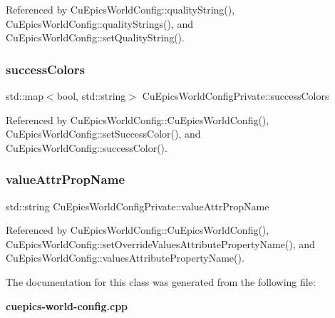 Referenced by Cu\+Epics\+World\+Config\+::quality\+String(), Cu\+Epics\+World\+Config\+::quality\+Strings(), and Cu\+Epics\+World\+Config\+::set\+Quality\+String().

\mbox{\label{classCuEpicsWorldConfigPrivate_a244f2beac45bda2ca2ff4de24f0e2943}} 
\subsubsection{success\+Colors}
{\footnotesize\ttfamily std\+::map$<$bool, std\+::string$>$ Cu\+Epics\+World\+Config\+Private\+::success\+Colors}



Referenced by Cu\+Epics\+World\+Config\+::\+Cu\+Epics\+World\+Config(), Cu\+Epics\+World\+Config\+::set\+Success\+Color(), and Cu\+Epics\+World\+Config\+::success\+Color().

\mbox{\label{classCuEpicsWorldConfigPrivate_a2ef8588f15f518d5fef22fcede82d8dc}} 
\subsubsection{value\+Attr\+Prop\+Name}
{\footnotesize\ttfamily std\+::string Cu\+Epics\+World\+Config\+Private\+::value\+Attr\+Prop\+Name}



Referenced by Cu\+Epics\+World\+Config\+::\+Cu\+Epics\+World\+Config(), Cu\+Epics\+World\+Config\+::set\+Override\+Values\+Attribute\+Property\+Name(), and Cu\+Epics\+World\+Config\+::values\+Attribute\+Property\+Name().



The documentation for this class was generated from the following file\+:\begin{DoxyCompactItemize}
\item 
\textbf{ cuepics-\/world-\/config.\+cpp}\end{DoxyCompactItemize}
